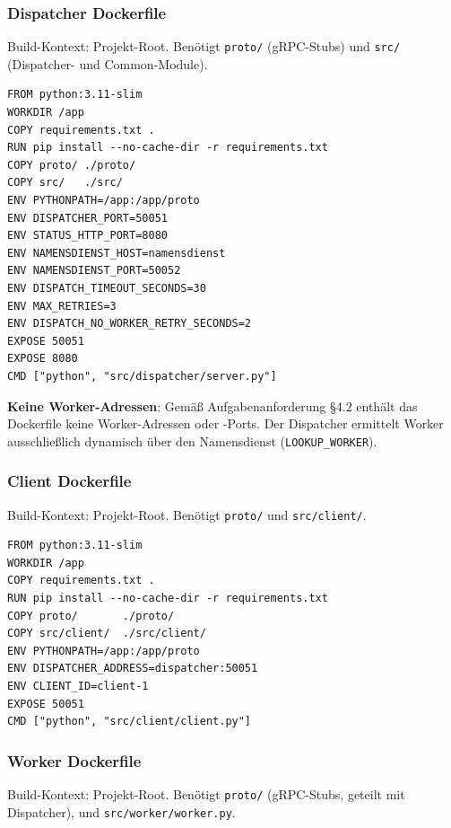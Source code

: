 \subsubsection*{Dispatcher Dockerfile}

Build-Kontext: Projekt-Root. Benötigt \texttt{proto/} (gRPC-Stubs) und
\texttt{src/} (Dispatcher- und Common-Module).

\begin{lstlisting}[language={},caption={Dispatcher Dockerfile (src/: Dockerfile)}]
FROM python:3.11-slim
WORKDIR /app
COPY requirements.txt .
RUN pip install --no-cache-dir -r requirements.txt
COPY proto/ ./proto/
COPY src/   ./src/
ENV PYTHONPATH=/app:/app/proto
ENV DISPATCHER_PORT=50051
ENV STATUS_HTTP_PORT=8080
ENV NAMENSDIENST_HOST=namensdienst
ENV NAMENSDIENST_PORT=50052
ENV DISPATCH_TIMEOUT_SECONDS=30
ENV MAX_RETRIES=3
ENV DISPATCH_NO_WORKER_RETRY_SECONDS=2
EXPOSE 50051
EXPOSE 8080
CMD ["python", "src/dispatcher/server.py"]
\end{lstlisting}

\noindent \textbf{Keine Worker-Adressen}: Gemäß Aufgabenanforderung §4.2 enthält das
Dockerfile keine Worker-Adressen oder -Ports. Der Dispatcher ermittelt
Worker ausschließlich dynamisch über den Namensdienst (\texttt{LOOKUP\_WORKER}).
\newpage
\subsubsection*{Client Dockerfile}

Build-Kontext: Projekt-Root. Benötigt \texttt{proto/} und \texttt{src/client/}.

\begin{lstlisting}[language={},caption={Client Dockerfile (src/client/Dockerfile)}]
FROM python:3.11-slim
WORKDIR /app
COPY requirements.txt .
RUN pip install --no-cache-dir -r requirements.txt
COPY proto/       ./proto/
COPY src/client/  ./src/client/
ENV PYTHONPATH=/app:/app/proto
ENV DISPATCHER_ADDRESS=dispatcher:50051
ENV CLIENT_ID=client-1
EXPOSE 50051
CMD ["python", "src/client/client.py"]
\end{lstlisting}

\subsubsection*{Worker Dockerfile}

Build-Kontext: Projekt-Root. Benötigt \texttt{proto/} (gRPC-Stubs, geteilt
mit Dispatcher),  und
\texttt{src/worker/worker.py}.

